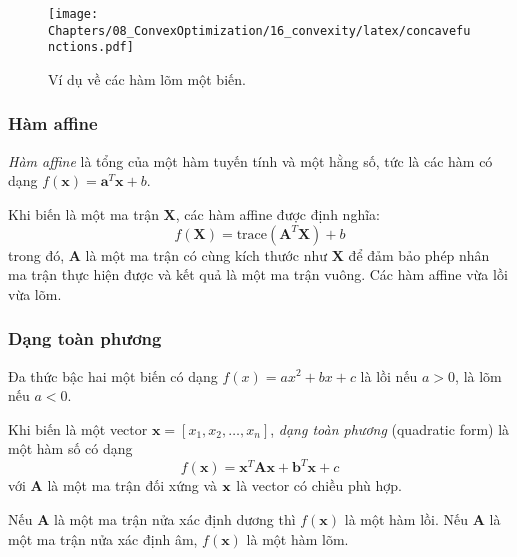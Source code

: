 \begin{figure}[t]
\centering
\texttt{[image: Chapters/08\_ConvexOptimization/16\_convexity/latex/concavefunctions.pdf]}
\caption[]{Ví dụ về các hàm lõm một biến.}
\label{fig:16_concavefunctions}
\captionsetup[figure]{format=rule, justification=centering}
\end{figure}

\subsubsection{Hàm affine}
\textit{Hàm affine} là tổng của một hàm tuyến tính và một hằng số, tức là các hàm có dạng $f(\mathbf{x}) = \mathbf{a}^T\mathbf{x} + b $.

Khi biến là một ma trận $\mathbf{X}$, các hàm affine được định nghĩa:
\begin{equation*}
f(\mathbf{X}) = \text{trace}(\mathbf{A}^T\mathbf{X}) + b
\end{equation*}
trong đó, $\mathbf{A}$ là một ma trận có cùng kích thước như $\mathbf{X}$
để đảm bảo phép nhân ma trận thực hiện được và kết quả là một ma trận vuông.
Các hàm affine vừa lồi vừa lõm.

\subsubsection{Dạng toàn phương}
Đa thức bậc hai một biến có dạng $f(x) = a x^2 + bx + c$ là lồi nếu $a > 0$, là lõm nếu $a < 0$.

Khi biến là một vector $\mathbf{x} = [x_1, x_2, \dots, x_n]$, \textit{dạng
toàn phương} ({quadratic form}) là một hàm số có dạng
\begin{equation*}
f(\mathbf{x}) = \mathbf{x}^T\mathbf{A}\mathbf{x} + \mathbf{b}^T\mathbf{x} + c
\end{equation*}
với $\mathbf{A}$ là một ma trận đối xứng và $\mathbf{x}$ là vector có chiều phù hợp.

Nếu $\mathbf{A}$ là một ma trận nửa xác định dương thì $f(\mathbf{x})$ là một
hàm lồi. Nếu $\mathbf{A}$ là một ma trận nửa xác định âm, $f(\mathbf{x})$
là một hàm lõm.

